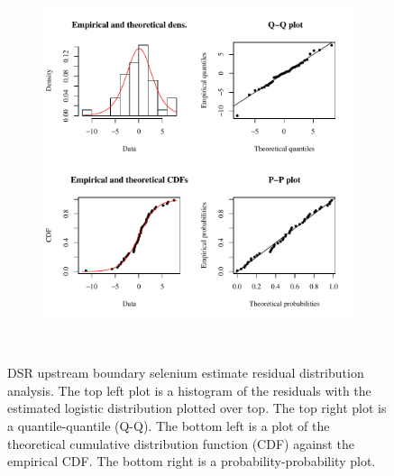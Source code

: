 \begin{landscape}
\begin{figure}
\begin{subfigure}{0.7\textwidth}
			\includegraphics[width=\tableCustomSize]{"Figures/Results_DSR/Stochastic/Conc Model res-fit D106C"}
		\end{subfigure}\\
		\caption[DSR upstream boundary selenium estimate residual distribution analysis.]{DSR upstream boundary selenium estimate residual distribution analysis.  The top left plot is a histogram of the residuals with the estimated logistic distribution plotted over top.  The top right plot is a quantile-quantile (Q-Q).  The bottom left is a plot of the theoretical cumulative distribution function (CDF) against the empirical CDF.  The bottom right is a probability-probability plot.}
		\label{fig:concRes-Fit_DS}
	\end{figure}
\end{landscape}

